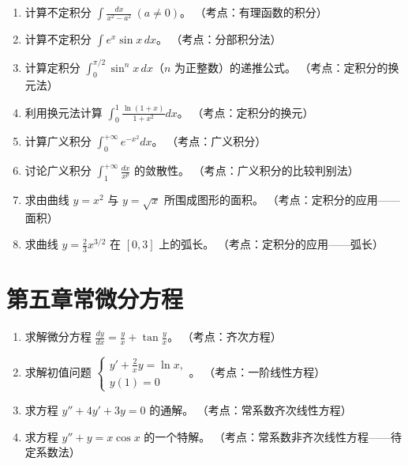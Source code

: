 \documentclass[12pt,a4paper]{ctexart}
\begin{document}
\begin{enumerate}[leftmargin=*,label=\arabic*.,start=20]
  \item 计算不定积分 $\displaystyle\int \frac{dx}{x^2-a^2}\ (a \neq 0)$。
    （考点：有理函数的积分）

  \item 计算不定积分 $\displaystyle\int e^x \sin x \, dx$。
    （考点：分部积分法）

  \item 计算定积分 $\displaystyle\int_0^{\pi/2} \sin^n x \, dx$（$n$ 为正整数）的递推公式。
    （考点：定积分的换元法）

  \item 利用换元法计算 $\displaystyle\int_0^1 \frac{\ln(1+x)}{1+x^2} dx$。
    （考点：定积分的换元）

  \item 计算广义积分 $\displaystyle\int_0^{+\infty} e^{-x^2} dx$。
    （考点：广义积分）

  \item 讨论广义积分 $\displaystyle\int_1^{+\infty} \frac{dx}{x^p}$ 的敛散性。
    （考点：广义积分的比较判别法）

  \item 求由曲线 $y = x^2$ 与 $y = \sqrt{x}$ 所围成图形的面积。
    （考点：定积分的应用——面积）

  \item 求曲线 $y = \frac{2}{3}x^{3/2}$ 在 $[0,3]$ 上的弧长。
    （考点：定积分的应用——弧长）
\end{enumerate}

\section*{第五章\quad 常微分方程}

\begin{enumerate}[leftmargin=*,label=\arabic*.,start=28]
  \item 求解微分方程 $\displaystyle\frac{dy}{dx} = \frac{y}{x} + \tan\frac{y}{x}$。
    （考点：齐次方程）

  \item 求解初值问题 $\begin{cases} y' + \frac{2}{x}y = \ln x, \\ y(1) = 0 \end{cases}$。
    （考点：一阶线性方程）

  \item 求方程 $y'' + 4y' + 3y = 0$ 的通解。
    （考点：常系数齐次线性方程）

  \item 求方程 $y'' + y = x\cos x$ 的一个特解。
    （考点：常系数非齐次线性方程——待定系数法）
\end{enumerate}
\end{document}
